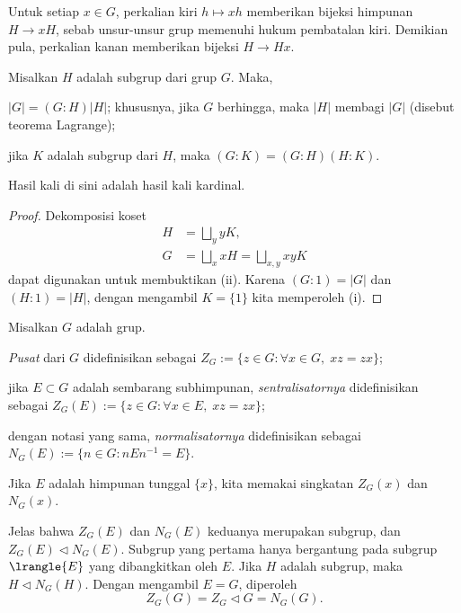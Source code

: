Untuk setiap $x\in G$, perkalian kiri $h\mapsto xh$ memberikan bijeksi himpunan $H\to xH$, sebab unsur-unsur grup memenuhi hukum pembatalan kiri. Demikian pula, perkalian kanan memberikan bijeksi $H\to Hx$.

\begin{proposition}\label{prop:Lagrange}
	Misalkan $H$ adalah subgrup dari grup $G$. Maka,
	\begin{compactenum}[(i)]
		\item $|G|=(G:H)|H|$; khususnya, jika $G$ berhingga, maka $|H|$ membagi $|G|$ (disebut teorema Lagrange);
		\item jika $K$ adalah subgrup dari $H$, maka $(G:K)=(G:H)(H:K)$.
	\end{compactenum}
	Hasil kali di sini adalah hasil kali kardinal.
\end{proposition}
\begin{proof}
	Dekomposisi koset
	\begin{align*}
		H &= \bigsqcup_y yK, \\
		G &= \bigsqcup_x xH = \bigsqcup_{x,y} xyK
	\end{align*}
	dapat digunakan untuk membuktikan (ii). Karena $(G:1)=|G|$ dan $(H:1)=|H|$, dengan mengambil $K=\{1\}$ kita memperoleh (i).
\end{proof}

\begin{definition}
	Misalkan $G$ adalah grup.
	\begin{compactenum}[(i)]
		\item \emph{Pusat} dari $G$ didefinisikan sebagai $Z_G:=\{z\in G:\forall x\in G,\;xz=zx\}$;
		\item jika $E\subset G$ adalah sembarang subhimpunan, \emph{sentralisatornya} didefinisikan sebagai $Z_G(E):=\{z\in G:\forall x\in E,\;xz=zx\}$;
		\item dengan notasi yang sama, \emph{normalisatornya} didefinisikan sebagai $N_G(E):=\{n\in G:nEn^{-1}=E\}$.
	\end{compactenum}
	Jika $E$ adalah himpunan tunggal $\{x\}$, kita memakai singkatan $Z_G(x)$ dan $N_G(x)$.
\end{definition}

Jelas bahwa $Z_G(E)$ dan $N_G(E)$ keduanya merupakan subgrup, dan $Z_G(E)\lhd N_G(E)$. Subgrup yang pertama hanya bergantung pada subgrup $\lrangle{E}$ yang dibangkitkan oleh $E$. Jika $H$ adalah subgrup, maka $H\lhd N_G(H)$. Dengan mengambil $E=G$, diperoleh
\[ Z_G(G) = Z_G \lhd G = N_G(G). \]


